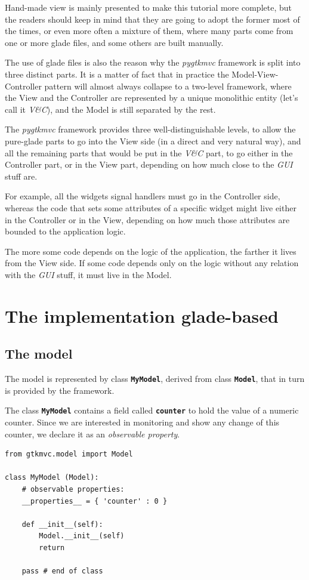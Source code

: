 \documentclass{article}
\newcommand{\kw}[1]{\emph{#1}\xspace}
\newcommand{\gui}{\kw{GUI}}
\newcommand{\pygtkmvc}{\kw{pygtkmvc}}
\newcommand{\codename}[1]{\texttt{\bfseries \textcolor {codecolor}{#1}}\xspace}
\newcommand{\codesize}{\small } %
\newcommand{\vc}{\kw{V\&C}}
\begin{document}
Hand-made view is mainly presented to make this tutorial more
complete, but the readers should keep in mind that they are going to
adopt the former most of the times, or even more often a mixture of
them, where many parts come from one or more glade files, and some
others are built manually.

The use of glade files is also the reason why the \pygtkmvc framework
is split into three distinct parts. It is a matter of fact that in
practice the Model-View-Controller pattern will almost always collapse
to a two-level framework, where the View and the Controller are
represented by a unique monolithic entity (let's call it \vc),
and the Model is still separated by the rest.

The \pygtkmvc framework provides three well-distinguishable levels, to
allow the pure-glade parts to go into the View side (in a direct and
very natural way), and all the remaining parts that would be put in
the \vc part, to go either in the Controller part, or in the View
part, depending on how much close to the \gui stuff are.

For example, all the widgets signal handlers must go in the Controller
side, whereas the code that sets some attributes of a specific widget
might live either in the Controller or in the View, depending on how
much those attributes are bounded to the application logic.

The more some code depends on the logic of the application, the
farther it lives from the View side. If some code depends only on the
logic without any relation with the \gui stuff, it must live in the
Model.


\section{The implementation glade-based}

\subsection{The model}
The model is represented by class \codename{MyModel}, derived from
class \codename{Model}, that in turn is provided by the framework.

The class \codename{MyModel} contains a field called
\codename{counter} to hold the value of a numeric counter. Since we
are interested in monitoring and show any change of this counter, we
declare it as an \emph{observable property}.


{ \codesize 
\begin{verbatim}   
from gtkmvc.model import Model

class MyModel (Model):
    # observable properties:
    __properties__ = { 'counter' : 0 }

    def __init__(self):
        Model.__init__(self)
        return

    pass # end of class
\end{verbatim}
} 
\end{document}
